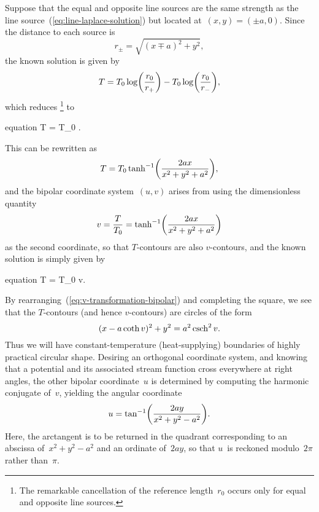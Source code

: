 Suppose that the equal and opposite line sources
are the same strength as the line source~(\ref{eq:line-laplace-solution})
but located at~$(x, y) = (\pm a, 0)$.
Since the distance to each source is
\begin{equation}
  r_\pm = \sqrt{(x \mp a)^2 + y^2},
  \label{eq:bipolar-source-distances}
\end{equation}
the known solution is given by
\begin{equation}
  T =
    T_0 \log \roundbr*{\frac{r_0}{r_+}}
      -
    T_0 \log \roundbr*{\frac{r_0}{r_-}},
  \label{eq:bipolar-laplace-solution-terms}
\end{equation}
which reduces%
\footnote{
  The remarkable cancellation of the reference length~$r_0$
  occurs only for equal and opposite line sources.
}
to
\begin{important}{equation}
  T = T_0 \log {}.
  \label{eq:bipolar-laplace-solution-source-distances}
\end{important}
This can be rewritten as
\begin{equation}
  T = T_0 \tanh^{-1} \roundbr*{\frac{2 a x}{x^2 + y^2 + a^2}},
  \label{eq:bipolar-laplace-solution-inverse-tanh}
\end{equation}
and the bipolar coordinate system~$(u, v)$ arises
from using the dimensionless quantity
\begin{equation}
  v
    = \frac{T}{T_0}
    = \tanh^{-1} \roundbr*{\frac{2 a x}{x^2 + y^2 + a^2}}
  \label{eq:v-transformation-bipolar}
\end{equation}
as the second coordinate,
so that $T$-contours are also $v$-contours,
and the known solution is simply given by
\begin{important}{equation}
  T = T_0 \cdot v.
  \label{eq:bipolar-laplace-solution}
\end{important}
By rearranging~(\ref{eq:v-transformation-bipolar}) and completing the square,
we see that the $T$-contours (and hence $v$-contours) are circles of the form
\begin{equation}
  (x - a \coth v)^2 + y^2 = a^2 \operatorname{csch}^2 v.
  \label{eq:bipolar-circle-v}
\end{equation}
Thus we will have constant-temperature (heat-supplying) boundaries
of highly practical circular shape.
Desiring an orthogonal coordinate system,
and knowing that a potential and its associated stream function
cross everywhere at right angles,
the other bipolar coordinate~$u$ is determined by computing
the harmonic conjugate of~$v$,
yielding the angular coordinate
\begin{equation}
  u = \tan^{-1} \roundbr*{\frac{2 a y}{x^2 + y^2 - a^2}}.
  \label{eq:u-transformation-bipolar}
\end{equation}
Here, the arctangent is to be returned in the quadrant corresponding to
an abscissa of~$x^2 + y^2 - a^2$ and an ordinate of~$2 a y$,
so that $u$~is reckoned modulo~$2 \pi$ rather than~$\pi$.

